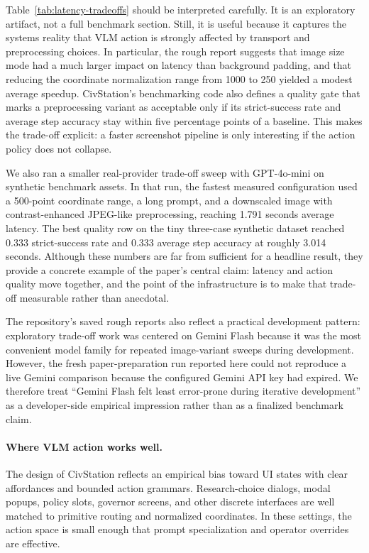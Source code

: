 Table~\ref{tab:latency-tradeoffs} should be interpreted carefully. It is an exploratory artifact, not a full benchmark section. Still, it is useful because it captures the systems reality that VLM action is strongly affected by transport and preprocessing choices. In particular, the rough report suggests that image size mode had a much larger impact on latency than background padding, and that reducing the coordinate normalization range from 1000 to 250 yielded a modest average speedup. CivStation's benchmarking code also defines a quality gate that marks a preprocessing variant as acceptable only if its strict-success rate and average step accuracy stay within five percentage points of a baseline. This makes the trade-off explicit: a faster screenshot pipeline is only interesting if the action policy does not collapse.

We also ran a smaller real-provider trade-off sweep with GPT-4o-mini on synthetic benchmark assets. In that run, the fastest measured configuration used a 500-point coordinate range, a long prompt, and a downscaled image with contrast-enhanced JPEG-like preprocessing, reaching 1.791 seconds average latency. The best quality row on the tiny three-case synthetic dataset reached 0.333 strict-success rate and 0.333 average step accuracy at roughly 3.014 seconds. Although these numbers are far from sufficient for a headline result, they provide a concrete example of the paper's central claim: latency and action quality move together, and the point of the infrastructure is to make that trade-off measurable rather than anecdotal.

The repository's saved rough reports also reflect a practical development pattern: exploratory trade-off work was centered on Gemini Flash because it was the most convenient model family for repeated image-variant sweeps during development. However, the fresh paper-preparation run reported here could not reproduce a live Gemini comparison because the configured Gemini API key had expired. We therefore treat ``Gemini Flash felt least error-prone during iterative development'' as a developer-side empirical impression rather than as a finalized benchmark claim.

\paragraph{Where VLM action works well.}
The design of CivStation reflects an empirical bias toward UI states with clear affordances and bounded action grammars. Research-choice dialogs, modal popups, policy slots, governor screens, and other discrete interfaces are well matched to primitive routing and normalized coordinates. In these settings, the action space is small enough that prompt specialization and operator overrides are effective.


